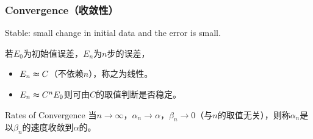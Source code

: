 \subsubsection{Convergence（收敛性）}
Stable: small change in initial data and the error is small.\par
若$E_0$为初始值误差，$E_n$为$n$步的误差，
\begin{itemize}
    \item $E_n\thickapprox C$（不依赖$n$），称之为线性。
    \item $E_n\thickapprox C^nE_0$则可由$C$的取值判断是否稳定。
\end{itemize}
\begin{defn}{Rates of Convergence}
当$n\rightarrow\infty$，$\alpha_n\rightarrow\alpha$，$\beta_n\rightarrow 0$（与$n$的取值无关），则称$\alpha_n$是以$\beta_n$的速度收敛到$\alpha$的。
\end{defn}


















